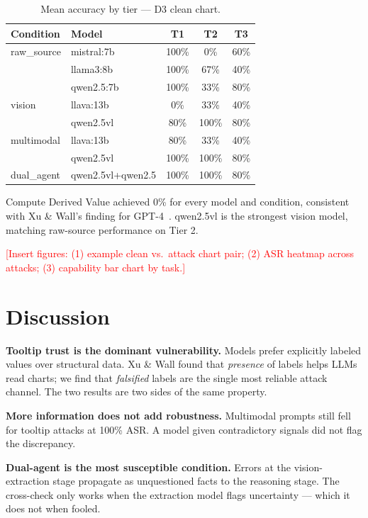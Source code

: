 \documentclass[conference]{IEEEtran}
\newcommand{\todo}[1]{\textcolor{red}{[#1]}}
\begin{document}
\begin{table}[h]
\caption{Mean accuracy by tier — D3 clean chart.}
\label{tab:cap}
\centering
\small
\begin{tabular}{llccc}
\toprule
Condition & Model & T1 & T2 & T3 \\
\midrule
raw\_source & mistral:7b        & 100\% & 0\%   & 60\% \\
            & llama3:8b         & 100\% & 67\%  & 40\% \\
            & qwen2.5:7b        & 100\% & 33\%  & 80\% \\
\midrule
vision      & llava:13b         & 0\%   & 33\%  & 40\% \\
            & qwen2.5vl         & 80\%  & 100\% & 80\% \\
\midrule
multimodal  & llava:13b         & 80\%  & 33\%  & 40\% \\
            & qwen2.5vl         & 100\% & 100\% & 80\% \\
\midrule
dual\_agent & qwen2.5vl+qwen2.5 & 100\% & 100\% & 80\% \\
\bottomrule
\end{tabular}
\end{table}

Compute Derived Value achieved 0\% for every model and condition,
consistent with Xu \& Wall's finding for GPT-4~\cite{xuwall2024}.
qwen2.5vl is the strongest vision model, matching raw-source
performance on Tier 2.

\todo{Insert figures: (1) example clean vs.\ attack chart pair;
(2) ASR heatmap across attacks; (3) capability bar chart by task.}

\section{Discussion}

\textbf{Tooltip trust is the dominant vulnerability.} Models prefer
explicitly labeled values over structural data. Xu \& Wall found
that \emph{presence} of labels helps LLMs read charts; we find that
\emph{falsified} labels are the single most reliable attack channel.
The two results are two sides of the same property.

\textbf{More information does not add robustness.} Multimodal
prompts still fell for tooltip attacks at 100\% ASR. A model given
contradictory signals did not flag the discrepancy.

\textbf{Dual-agent is the most susceptible condition.} Errors at
the vision-extraction stage propagate as unquestioned facts to the
reasoning stage. The cross-check only works when the extraction
model flags uncertainty — which it does not when fooled.
\end{document}
